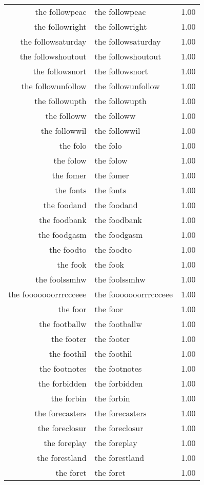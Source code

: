 \begin{table}[ht]
\begin{tabular}{rlr}
  the followpeac & the followpeac & 1.00 \\ 
  the followright & the followright & 1.00 \\ 
  the followsaturday & the followsaturday & 1.00 \\ 
  the followshoutout & the followshoutout & 1.00 \\ 
  the followsnort & the followsnort & 1.00 \\ 
  the followunfollow & the followunfollow & 1.00 \\ 
  the followupth & the followupth & 1.00 \\ 
  the followw & the followw & 1.00 \\ 
  the followwil & the followwil & 1.00 \\ 
  the folo & the folo & 1.00 \\ 
  the folow & the folow & 1.00 \\ 
  the fomer & the fomer & 1.00 \\ 
  the fonts & the fonts & 1.00 \\ 
  the foodand & the foodand & 1.00 \\ 
  the foodbank & the foodbank & 1.00 \\ 
  the foodgasm & the foodgasm & 1.00 \\ 
  the foodto & the foodto & 1.00 \\ 
  the fook & the fook & 1.00 \\ 
  the foolssmhw & the foolssmhw & 1.00 \\ 
  the fooooooorrrccceee & the fooooooorrrccceee & 1.00 \\ 
  the foor & the foor & 1.00 \\ 
  the footballw & the footballw & 1.00 \\ 
  the footer & the footer & 1.00 \\ 
  the foothil & the foothil & 1.00 \\ 
  the footnotes & the footnotes & 1.00 \\ 
  the forbidden & the forbidden & 1.00 \\ 
  the forbin & the forbin & 1.00 \\ 
  the forecasters & the forecasters & 1.00 \\ 
  the foreclosur & the foreclosur & 1.00 \\ 
  the foreplay & the foreplay & 1.00 \\ 
  the forestland & the forestland & 1.00 \\ 
  the foret & the foret & 1.00 \\ 

\end{tabular}
\end{table}
